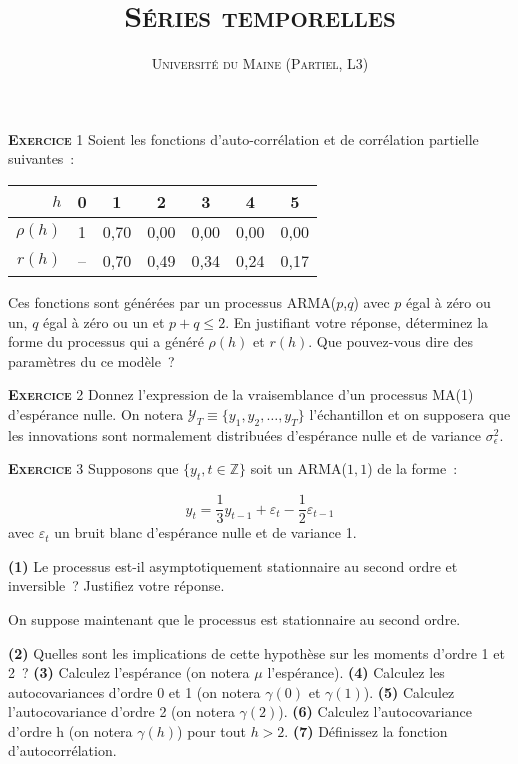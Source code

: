 \documentclass[10pt,a4paper,notitlepage,onecolumn]{article}
\newcommand{\exercice}[1]{\textsc{\textbf{Exercice}} #1}
\newcommand{\question}[1]{\textbf{(#1)}}
\begin{document}
\title{\textsc{Séries temporelles}}
\author{\textsc{Université du Maine (Partiel, L3)}}
\date{}


\maketitle

\exercice{1} Soient les fonctions d'auto-corrélation et de corrélation
partielle suivantes :
\begin{table}[H]
  \centering
  \begin{tabular}{r|cccccc}
    \hline\hline
    $h$ & 0 & 1 & 2 & 3 & 4 & 5 \\\hline
    $\rho (h)$ & 1 & 0,70 & 0,00 & 0,00 & 0,00 & 0,00\\
    $r(h)$ & -- & 0,70 & 0,49 & 0,34 & 0,24 & 0,17\\
    \hline\hline
  \end{tabular}
\end{table}
\noindent Ces  fonctions sont générées par  un processus ARMA($p$,$q$)
avec $p$ égal à zéro ou un, $q$ égal  à zéro ou un et $p+q \leq 2$. En
justifiant  votre réponse,  déterminez  la forme  du  processus qui  a
généré $\rho(h)$ et $r(h)$. Que  pouvez-vous dire des paramètres du ce
modèle~?

\bigskip
\bigskip


\exercice{2}  Donnez l'expression de la vraisemblance d'un processus
MA(1) d'espérance nulle. On notera $\mathcal Y_T \equiv \{y_1,y_2,\dots,y_T\}$
l'échantillon et on supposera que les innovations sont normalement
distribuées d'espérance nulle et de variance $\sigma_{\epsilon}^2$.

\bigskip
\bigskip

\exercice{3} Supposons que $\{y_t,t\in\mathbb Z\}$ soit un ARMA($1,1$) de la forme :

\[
y_t = \frac{1}{3}y_{t-1} + \varepsilon_t - \frac{1}{2} \varepsilon_{t-1}
\]
avec $\varepsilon_t$ un bruit blanc d'espérance nulle et de variance 1.\newline

\question{1}   Le    processus   est-il   asymptotiquement
stationnaire  au   second  ordre   et  inversible~?   Justifiez  votre
réponse.\newline

On suppose maintenant que le processus est stationnaire au second
ordre.\newline

\question{2} Quelles sont les implications de cette hypothèse sur les
moments d'ordre 1 et 2 ? \question{3} Calculez l'espérance (on notera
$\mu$ l'espérance). \question{4} Calculez les autocovariances d'ordre
0 et 1 (on notera $\gamma(0)$ et $\gamma(1)$). \question{5} Calculez
l'autocovariance d'ordre 2 (on notera $\gamma(2)$). \question{6}
Calculez l'autocovariance d'ordre h (on notera $\gamma(h)$) pour tout
$h>2$.  \question{7} Définissez la fonction d'autocorrélation.
\end{document}
